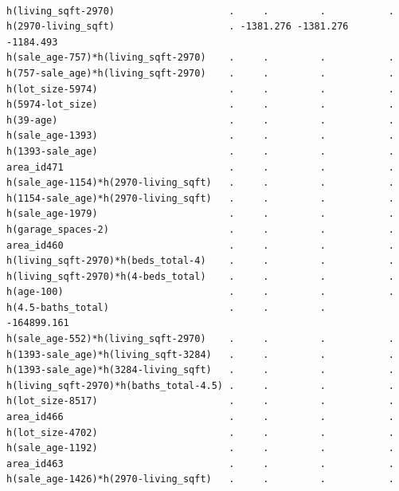 \documentclass[
]{article}
\begin{document}
\begin{verbatim}
                                                                        
h(living_sqft-2970)                    .     .         .           .    
h(2970-living_sqft)                    . -1381.276 -1381.276   -1184.493
h(sale_age-757)*h(living_sqft-2970)    .     .         .           .    
h(757-sale_age)*h(living_sqft-2970)    .     .         .           .    
h(lot_size-5974)                       .     .         .           .    
h(5974-lot_size)                       .     .         .           .    
h(39-age)                              .     .         .           .    
h(sale_age-1393)                       .     .         .           .    
h(1393-sale_age)                       .     .         .           .    
area_id471                             .     .         .           .    
h(sale_age-1154)*h(2970-living_sqft)   .     .         .           .    
h(1154-sale_age)*h(2970-living_sqft)   .     .         .           .    
h(sale_age-1979)                       .     .         .           .    
h(garage_spaces-2)                     .     .         .           .    
area_id460                             .     .         .           .    
h(living_sqft-2970)*h(beds_total-4)    .     .         .           .    
h(living_sqft-2970)*h(4-beds_total)    .     .         .           .    
h(age-100)                             .     .         .           .    
h(4.5-baths_total)                     .     .         .     -164899.161
h(sale_age-552)*h(living_sqft-2970)    .     .         .           .    
h(1393-sale_age)*h(living_sqft-3284)   .     .         .           .    
h(1393-sale_age)*h(3284-living_sqft)   .     .         .           .    
h(living_sqft-2970)*h(baths_total-4.5) .     .         .           .    
h(lot_size-8517)                       .     .         .           .    
area_id466                             .     .         .           .    
h(lot_size-4702)                       .     .         .           .    
h(sale_age-1192)                       .     .         .           .    
area_id463                             .     .         .           .    
h(sale_age-1426)*h(2970-living_sqft)   .     .         .           .    
                                                                             

\end{verbatim}
\end{document}
